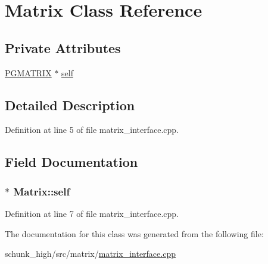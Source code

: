 \hypertarget{classMatrix}{\section{Matrix Class Reference}
\label{classMatrix}
}
\subsection*{Private Attributes}
\begin{DoxyCompactItemize}
\item 
\hyperlink{gmatrix_8h_ad8edc274a17feb9e4fca93e620253bed}{P\-G\-M\-A\-T\-R\-I\-X} $\ast$ \hyperlink{classMatrix_a3cd31e02b5127a4a926add88d0d9ec63}{self}
\end{DoxyCompactItemize}


\subsection{Detailed Description}


Definition at line 5 of file matrix\-\_\-interface.\-cpp.



\subsection{Field Documentation}
\hypertarget{classMatrix_a3cd31e02b5127a4a926add88d0d9ec63}{
\subsubsection[{self}]{$\ast$ Matrix\-::self\hspace{0.3cm}{\ttfamily [private]}}}\label{classMatrix_a3cd31e02b5127a4a926add88d0d9ec63}


Definition at line 7 of file matrix\-\_\-interface.\-cpp.



The documentation for this class was generated from the following file\-:\begin{DoxyCompactItemize}
\item 
schunk\-\_\-high/src/matrix/\hyperlink{matrix__interface_8cpp}{matrix\-\_\-interface.\-cpp}\end{DoxyCompactItemize}
